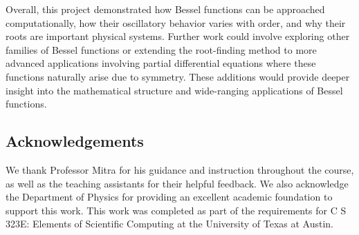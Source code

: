 \documentclass[linenumbers, twocolumn]{aastex631}
\begin{document}
\noindent Overall, this project demonstrated how Bessel functions can be approached
computationally, how their oscillatory behavior varies with order, and why their
roots are important physical systems. Further work could involve exploring other 
families of Bessel functions or extending the root-finding method to more
advanced applications involving partial differential equations where these functions
naturally arise due to symmetry. These additions would provide deeper insight into the
mathematical structure and wide-ranging applications of Bessel functions.


\subsection{Acknowledgements}
We thank Professor Mitra for his guidance and instruction throughout the course,
as well as the teaching assistants for their helpful feedback. We also
acknowledge the Department of Physics for providing an excellent academic foundation 
to support this work. This work was completed as part of the requirements for 
C S 323E: Elements of Scientific Computing at the University of Texas at Austin.

\newpage


\end{document}
